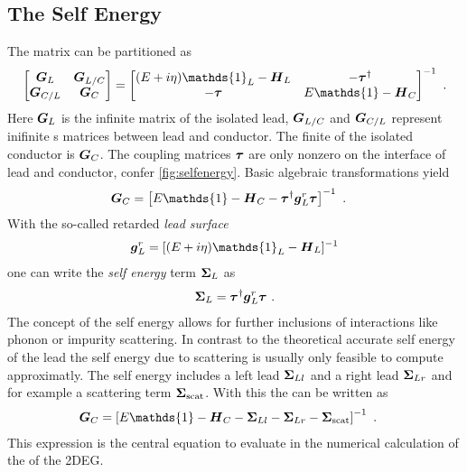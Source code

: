 \subsection{The Self Energy}
The \gfnc{} matrix can be partitioned as
\begin{align}
  \begin{bmatrix}
  \mat{G}_{L} & \mat{G}_{L/C}\\
  \mat{G}_{C/L} & \mat{G}_{C}
  \end{bmatrix}
  =
  \begin{bmatrix}
  (E+i\eta)\mathds{1}_{L} - \mat{H}_L  & -\v{\tau}^{\dagger} \\
	-\v{\tau} & E\mathds{1} - \mat{H}_C
  \end{bmatrix}^{-1}\ .
  \label{eqn:greendivided}
\end{align}
Here $\boldsymbol{G}_L$ is the infinite \gfnc{} matrix of the isolated lead, $\boldsymbol{G}_{L/C}$ and $\boldsymbol{G}_{C/L}$ represent inifinite \gfnc s matrices between lead and conductor. The finite \gfnc{} of the isolated conductor is $\boldsymbol{G}_C$. The coupling matrices $\boldsymbol{\tau}$ are only nonzero on the interface of lead and conductor, confer \cref{fig:selfenergy}.
Basic algebraic transformations yield \cite{Datta1997}
\begin{align}
\mat{G}_C& = \left[E\mathds{1}-\mat{H}_C -\v{\tau}^{\dagger} \mat{g}_L^r \v{\tau} \right]^{-1} \ .
\label{eqn:finitegreensfunction}
\end{align}
With the so-called retarded \emph{lead surface \gfnc{}}
\begin{align}
\mat{g}_L^r = [(E+i\eta)\mathds{1}_L - \mat{H}_L]^{-1}
\label{eqn:leadsurfacegfnc}
\end{align}
one can write the \emph{self energy} term $\boldsymbol{\Sigma}_L$ as
\begin{align}
\boldsymbol{\Sigma}_L = \boldsymbol{\tau}^{\dagger} \boldsymbol{g}_L^r \boldsymbol{\tau}\ .
\label{eqn:sigmal}
\end{align}
The concept of the self energy allows for further inclusions of interactions like phonon or impurity scattering. In contrast to the theoretical accurate self energy of the lead the self energy due to scattering is usually only feasible to compute approximatly. The self energy includes a left lead $\boldsymbol{\Sigma}_{Ll}$ and a right lead $\boldsymbol{\Sigma}_{Lr}$ and for example a scattering term $\boldsymbol{\Sigma}_{\text{scat}}$. With this the \gfnc{} can be written as
\begin{align}
\mat{G}_C& = \left[E\mathds{1}-\mat{H}_C -\mat{\Sigma}_{Ll}-\mat{\Sigma}_{Lr}-\mat{\Sigma}_{\text{scat}} \right]^{-1} \ .
\label{eqn:finitegreensfunctionwithselfenergy}
\end{align}
This expression is the central equation to evaluate in the numerical calculation of the \gfnc{} of the 2DEG. 
